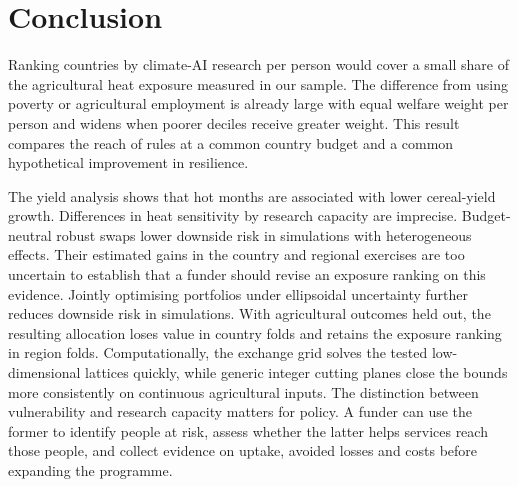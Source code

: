 \section{Conclusion}\label{sec:conclusion}

Ranking countries by climate-AI research per person would cover a small share of the
agricultural heat exposure measured in our sample. The difference from using poverty or
agricultural employment is already large with equal welfare weight per person and widens when
poorer deciles receive greater weight. This result compares the reach of rules at a common
country budget and a common hypothetical improvement in resilience.

The yield analysis shows that hot months are associated with lower cereal-yield growth.
Differences in heat sensitivity by research capacity are imprecise. Budget-neutral
robust swaps lower downside risk in simulations with heterogeneous effects. Their
estimated gains in the country and regional exercises are too uncertain to establish
that a funder should revise an exposure ranking on this evidence. Jointly optimising
portfolios under ellipsoidal uncertainty further reduces downside risk in simulations.
With agricultural outcomes held out, the resulting allocation loses value in country
folds and retains the exposure ranking in region folds. Computationally, the
exchange grid solves the tested low-dimensional lattices quickly, while
generic integer cutting planes close the bounds more consistently on
continuous agricultural inputs. The distinction between vulnerability and research capacity
matters for policy. A funder can use the former to identify people at risk, assess whether the
latter helps services reach those people, and collect evidence on uptake, avoided losses and
costs before expanding the programme.
